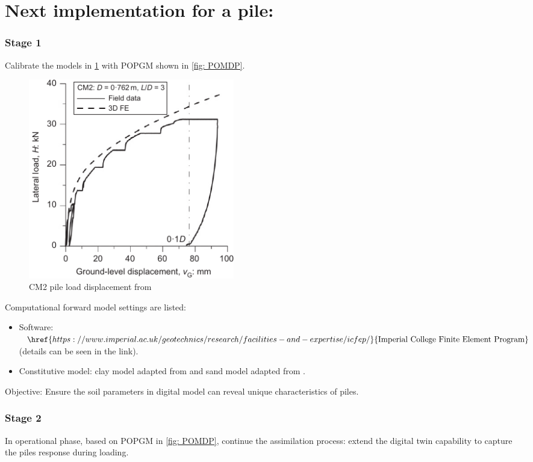 \section{Next implementation for a pile:}


\subsubsection{Stage 1}
Calibrate the models in \cref{fig: CM2pile} with \acrlong{POPGM} shown in \cref{fig: POMDP}.
\begin{figure}[H]
    \centering
    \includegraphics[width = 90mm]{Figures/figure-CM2.pdf}
\caption{CM2 pile load displacement from \protect\cite{zdravkovic2020}}
\label{fig: CM2pile}
\end{figure}
Computational forward model settings are listed:
\begin{itemize}[left=0cm]
    \item Software: $\href{https://www.imperial.ac.uk/geotechnics/research/facilities-and-expertise/icfep/}{\rm{Imperial \ College \ Finite\ Element\ Program}}$ (details can be seen in the link).
    \item Constitutive model: clay model adapted from \cite{zdravkovic2020} and sand model adapted from \cite{taborda2020}.
\end{itemize}
Objective: Ensure the soil parameters in digital model can reveal unique characteristics of piles.

\subsubsection{Stage 2}
In operational phase, based on \acrlong{POPGM} in \cref{fig: POMDP}, continue the assimilation process: extend the digital twin capability to capture the piles response during loading.

